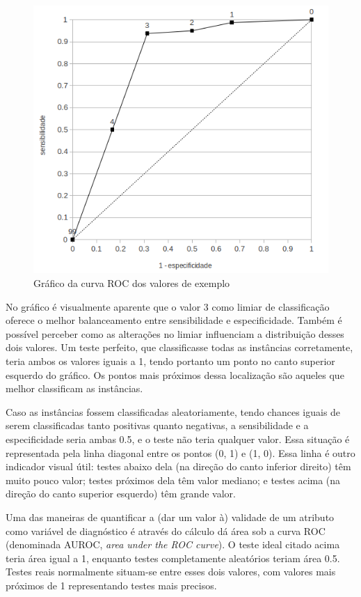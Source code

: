 \begin{figure}[h!]
\centering
\includegraphics[scale=0.5]{img/roc.png}
\caption{Gráfico da curva ROC dos valores de exemplo}
\label{fraud:roc}
\end{figure}

No gráfico é visualmente aparente que o valor 3 como limiar de classificação oferece o melhor balanceamento entre sensibilidade e especificidade. Também é possível perceber como as alterações no limiar influenciam a distribuição desses dois valores. Um teste perfeito, que classificasse todas as instâncias corretamente, teria ambos os valores iguais a 1, tendo portanto um ponto no canto superior esquerdo do gráfico. Os pontos mais próximos dessa localização são aqueles que melhor classificam as instâncias.

Caso as instâncias fossem classificadas aleatoriamente, tendo chances iguais de serem classificadas tanto positivas quanto negativas, a sensibilidade e a especificidade seria ambas 0.5, e o teste não teria qualquer valor. Essa situação é representada pela linha diagonal entre os pontos (0, 1) e (1, 0). Essa linha é outro indicador visual útil: testes abaixo dela (na direção do canto inferior direito) têm muito pouco valor; testes próximos dela têm valor mediano; e testes acima (na direção do canto superior esquerdo) têm grande valor.

Uma das maneiras de quantificar a (dar um valor à) validade de um atributo como variável de diagnóstico é através do cálculo dá área sob a curva ROC (denominada AUROC, \emph{area under the ROC curve}). O teste ideal citado acima teria área igual a 1, enquanto testes completamente aleatórios teriam área 0.5. Testes reais normalmente situam-se entre esses dois valores, com valores mais próximos de 1 representando testes mais precisos.

